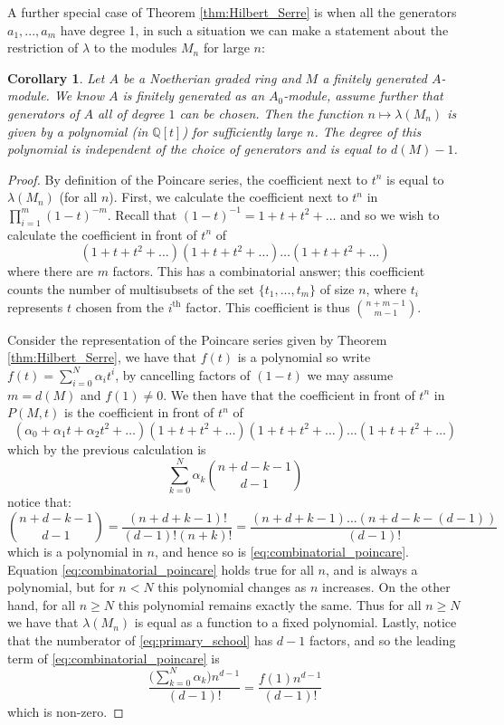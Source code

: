 \documentclass[12pt]{article}
\theoremstyle{plain}
\newtheorem{cor}[thm]{Corollary}
\theoremstyle{definition}
\newcommand{\bb}[1]{\mathbb{#1}}
\begin{document}
	A further special case of Theorem \ref{thm:Hilbert_Serre} is when all the generators $a_1,...,a_m$ have degree 1, in such a situation we can make a statement about the restriction of $\lambda$ to the modules $M_n$ for large $n$:
	\begin{cor}
		\label{cor:polynomial}
		Let $A$ be a Noetherian graded ring and $M$ a finitely generated $A$-module. We know $A$ is finitely generated as an $A_0$-module, assume further that generators of $A$ all of degree $1$ can be chosen. Then the function $n \mapsto \lambda(M_n)$ is given by a polynomial (in $\bb{Q}[t]$) for sufficiently large $n$. The degree of this polynomial is independent of the choice of generators and is equal to $d(M)-1$.
	\end{cor}
	\begin{proof}
		By definition of the Poincare series, the coefficient next to $t^n$ is equal to $\lambda(M_n)$ (for all $n$). First, we calculate the coefficient next to $t^n$ in $\prod_{i = 1}^m(1 - t)^{-m}$. Recall that $(1 - t)^{-1} = 1 + t + t^2 + \hdots$ and so we wish to calculate the coefficient in front of $t^n$ of
		\[(1 + t + t^2 + \hdots)(1 + t + t^2 + \hdots)\hdots (1 + t + t^2 + \hdots)\]
		where there are $m$ factors. This has a combinatorial answer; this coefficient counts the number of multisubsets of the set $\lbrace t_1,...,t_m\rbrace$ of size $n$, where $t_i$ represents $t$ chosen from the $i^{\text{th}}$ factor. This coefficient is thus ${n + m - 1 \choose m - 1}$.
		
		Consider the representation of the Poincare series given by Theorem \ref{thm:Hilbert_Serre}, we have that $f(t)$ is a polynomial so write $f(t) = \sum_{i = 0}^N \alpha_i t^i$, by cancelling factors of $(1 - t)$ we may assume $m = d(M)$ and $f(1) \neq 0$. We then have that the coefficient in front of $t^n$ in $P(M,t)$ is the coefficient in front of $t^n$ of
		\[(\alpha_0 + \alpha_1t + \alpha_2t^2 + \hdots)(1 + t + t^2 + \hdots)(1 + t + t^2 + \hdots)\hdots (1 + t + t^2 + \hdots)\]
		which by the previous calculation is
		\begin{equation}
			\label{eq:combinatorial_poincare}
			\sum_{k = 0}^N\alpha_k{n  + d - k - 1 \choose d - 1}
		\end{equation}
		notice that:
		\begin{equation}
			\label{eq:primary_school}
			{n  + d - k - 1 \choose d - 1} = \frac{(n + d + k - 1)!}{(d-1)!(n+k)!} = \frac{(n+d+k-1)\hdots(n+d-k-(d-1))}{(d-1)!}
		\end{equation}
		which is a polynomial in $n$, and hence so is \eqref{eq:combinatorial_poincare}. Equation \eqref{eq:combinatorial_poincare} holds true for all $n$, and is always a polynomial, but for $n < N$ this polynomial changes as $n$ increases. On the other hand, for all $n \geq N$ this polynomial remains exactly the same. Thus for all $n \geq N$ we have that $\lambda(M_n)$ is equal as a function to a fixed polynomial. Lastly, notice that the numberator of \eqref{eq:primary_school} has $d - 1$ factors, and so the leading term of \eqref{eq:combinatorial_poincare} is \[\frac{\big(\sum_{k = 0}^N\alpha_k\big)n^{d-1}}{(d-1)!} = \frac{f(1)n^{d-1}}{(d-1)!}\] which is non-zero.
	\end{proof}
\end{document}
